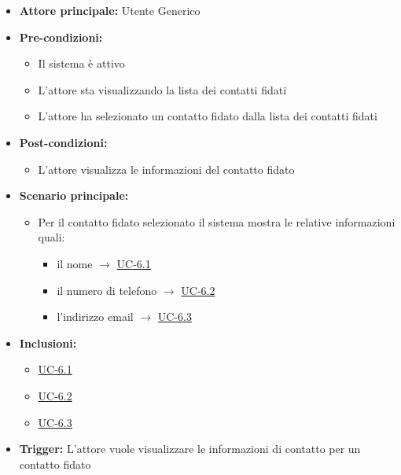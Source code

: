 \documentclass[a4paper,12pt]{article}
\begin{document}
\begin{itemize}
    \item \textbf{Attore principale:} Utente Generico
    \item \textbf{Pre-condizioni:} 
    \begin{itemize}
        \item Il sistema è attivo
        \item L'attore sta visualizzando la lista dei contatti fidati
        \item L'attore ha selezionato un contatto fidato dalla lista dei contatti fidati
    \end{itemize}
    \item \textbf{Post-condizioni:}
    \begin{itemize}
        \item L'attore visualizza le informazioni del contatto fidato
    \end{itemize}
    \item \textbf{Scenario principale:} 
    \begin{itemize}
        \item Per il contatto fidato selezionato il sistema mostra le relative informazioni quali:
        \begin{itemize}
            \item il nome $\rightarrow$ \hyperref[subsec:UC-6.1]{UC-6.1}
            \item il numero di telefono $\rightarrow$ \hyperref[subsec:UC-6.2]{UC-6.2}
            \item l'indirizzo email $\rightarrow$ \hyperref[subsec:UC-6.3]{UC-6.3}
        \end{itemize}
    \end{itemize}
    \item \textbf{Inclusioni:}
    \begin{itemize}
        \item \hyperref[subsec:UC-6.1]{UC-6.1}
        \item \hyperref[subsec:UC-6.2]{UC-6.2}
        \item \hyperref[subsec:UC-6.3]{UC-6.3}
    \end{itemize}
    \item \textbf{Trigger:} L'attore vuole visualizzare le informazioni di contatto per un contatto fidato
\end{itemize}
\end{document}

